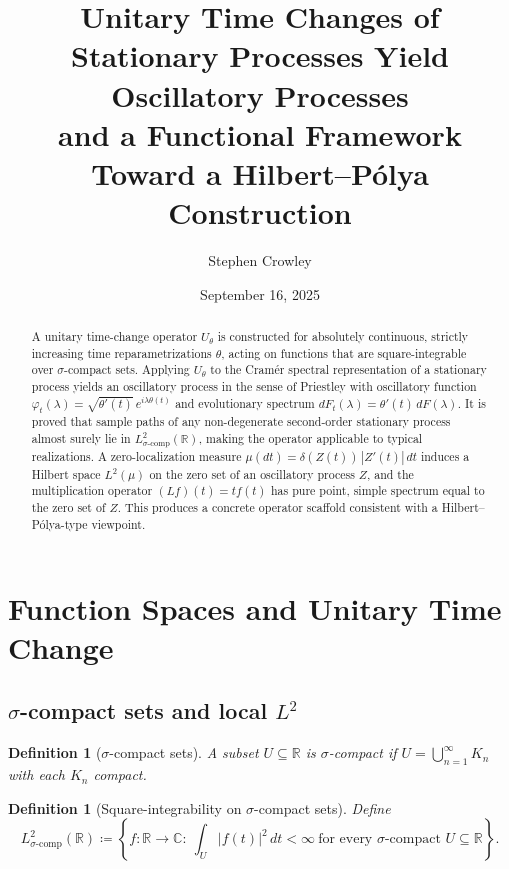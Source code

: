\documentclass{article}
\title{Unitary Time Changes of Stationary Processes Yield Oscillatory Processes \\ and a Functional Framework Toward a Hilbert--P\'olya Construction}
\author{Stephen Crowley}
\date{September 16, 2025}
\newtheorem{definition}[theorem]{Definition}
\begin{document}
\maketitle

\begin{abstract}
A unitary time-change operator $U_\theta$ is constructed for absolutely continuous, strictly increasing time reparametrizations $\theta$, acting on functions that are square-integrable over $\sigma$-compact sets. Applying $U_\theta$ to the Cram\'er spectral representation of a stationary process yields an oscillatory process in the sense of Priestley with oscillatory function $\varphi_t(\lambda)=\sqrt{\theta'(t)}\,e^{i\lambda\theta(t)}$ and evolutionary spectrum $dF_t(\lambda)=\theta'(t)\,dF(\lambda)$. It is proved that sample paths of any non-degenerate second-order stationary process almost surely lie in $L^2_{\sigma\text{-comp}}(\mathbb{R})$, making the operator applicable to typical realizations. A zero-localization measure $\mu(dt)=\delta(Z(t))\,|Z'(t)|\,dt$ induces a Hilbert space $L^2(\mu)$ on the zero set of an oscillatory process $Z$, and the multiplication operator $(Lf)(t)=t f(t)$ has pure point, simple spectrum equal to the zero set of $Z$. This produces a concrete operator scaffold consistent with a Hilbert--P\'olya-type viewpoint.
\end{abstract}

\tableofcontents

\section{Function Spaces and Unitary Time Change}\label{sec:functionspaces}

\subsection{$\sigma$-compact sets and local $L^2$}
\begin{definition}[$\sigma$-compact sets]\label{def:sigma_compact}
A subset $U\subseteq\mathbb{R}$ is $\sigma$-compact if $U=\bigcup_{n=1}^\infty K_n$ with each $K_n$ compact.
\end{definition}

\begin{definition}[Square-integrability on $\sigma$-compact sets]\label{def:L2sigma}
Define
\[
L^2_{\sigma\text{-comp}}(\mathbb{R})\coloneqq\left\{f:\mathbb{R}\to\mathbb{C}:\ \int_U |f(t)|^2\,dt<\infty\ \text{for every $\sigma$-compact }U\subseteq\mathbb{R}\right\}.
\]
\end{definition}
\end{document}
